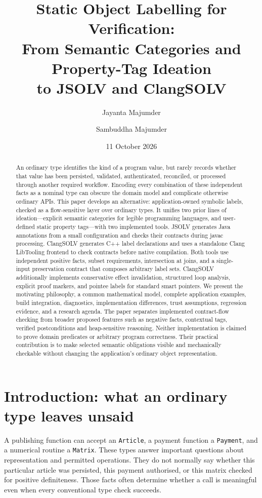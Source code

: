 \documentclass[11pt]{article}
\title{Static Object Labelling for Verification:\\
From Semantic Categories and Property-Tag Ideation\\
to JSOLV and ClangSOLV}
\author{Jayanta Majumder \and Sambuddha Majumder}
\date{11 October 2026}
\begin{document}
\maketitle
\begin{abstract}
An ordinary type identifies the kind of a program value, but rarely records
whether that value has been persisted, validated, authenticated, reconciled,
or processed through another required workflow. Encoding every combination
of these independent facts as a nominal type can obscure the domain model
and complicate otherwise ordinary APIs. This paper develops an alternative:
application-owned symbolic labels, checked as a flow-sensitive layer over
ordinary types. It unifies two prior lines of ideation---explicit semantic
categories for legible programming languages, and user-defined static property
tags---with two implemented tools. JSOLV generates Java annotations from a
small configuration and checks their contracts during javac processing.
ClangSOLV generates C++ label declarations and uses a standalone Clang
LibTooling frontend to check contracts before native compilation. Both tools
use independent positive facts, subset requirements, intersection at joins,
and a single-input preservation contract that composes arbitrary label sets.
ClangSOLV additionally implements conservative effect invalidation, structured
loop analysis, explicit proof markers, and pointee labels for standard smart
pointers. We present the motivating philosophy, a common mathematical model,
complete application examples, build integration, diagnostics, implementation
differences, trust assumptions, regression evidence, and a research agenda.
The paper separates implemented contract-flow checking from broader proposed
features such as negative facts, contextual tags, verified postconditions and
heap-sensitive reasoning. Neither implementation is claimed to prove domain
predicates or arbitrary program correctness. Their practical contribution is
to make selected semantic obligations visible and mechanically checkable
without changing the application's ordinary object representation.
\end{abstract}
\tableofcontents
\newpage

\section{Introduction: what an ordinary type leaves unsaid}
A publishing function can accept an \texttt{Article}, a payment function a
\texttt{Payment}, and a numerical routine a \texttt{Matrix}. These types answer
important questions about representation and permitted operations. They do
not normally say whether this particular article was persisted, this payment
authorised, or this matrix checked for positive definiteness. Those facts
often determine whether a call is meaningful even when every conventional
type check succeeds.
\end{document}
